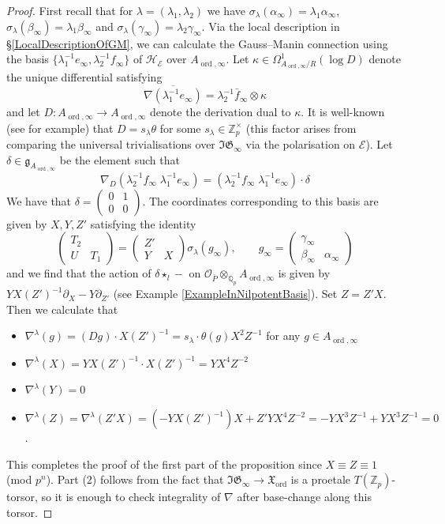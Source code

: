 \documentclass[10pt, oneside]{amsart}
\numberwithin{equation}{subsection}
\theoremstyle{definition}
\theoremstyle{remark}
\newcommand{\mbb}[1]{\mathbb{#1}}
\newcommand{\opn}[1]{\operatorname{#1}}
\newcommand{\tbyt}[4]{\left( \begin{matrix} #1 & #2 \\ #3 & #4 \end{matrix} \right)}
\begin{document}
\begin{proof}
First recall that for $\lambda = (\lambda_1, \lambda_2)$ we have $\sigma_{\lambda}(\alpha_{\infty}) = \lambda_1 \alpha_{\infty}$, $\sigma_{\lambda}(\beta_{\infty}) = \lambda_1 \beta_{\infty}$ and $\sigma_{\lambda}(\gamma_{\infty}) = \lambda_2 \gamma_{\infty}$. Via the local description in \S \ref{LocalDescriptionOfGM}, we can calculate the Gauss--Manin connection using the basis $\{\lambda_1^{-1} e_{\infty}, \lambda_2^{-1} f_{\infty} \}$ of $\mathcal{H}_{\mathcal{E}}$ over $A_{\opn{ord}, \infty}$.  Let $\kappa \in \Omega^1_{A_{\opn{ord}, \infty}/R}(\opn{log}D)$ denote the unique differential satisfying 
\[
 \overline{\nabla(\lambda_1^{-1}e_{\infty})} = \lambda_2^{-1}\bar{f}_{\infty} \otimes \kappa
\]
and let $D \colon A_{\opn{ord}, \infty} \to A_{\opn{ord}, \infty}$ denote the derivation dual to $\kappa$. It is well-known (see \cite{howe2020unipotent} for example) that $D = s_{\lambda} \theta$ for some $s_{\lambda} \in \mbb{Z}_p^{\times}$ (this factor arises from comparing the universal trivialisations over $\mathfrak{IG}_{\infty}$ via the polarisation on $\mathcal{E}$). Let $\delta \in \mathfrak{g}_{A_{\opn{ord}, \infty}}$ be the element such that
\[
 \nabla_{D}(\lambda_2^{-1}f_{\infty} \; \lambda_1^{-1}e_{\infty} ) = (\lambda_2^{-1}f_{\infty} \; \lambda_1^{-1}e_{\infty}) \cdot \delta 
\]
We have that $\delta = \tbyt{0}{1}{0}{0}$. The coordinates corresponding to this basis are given by $X, Y, Z'$ satisfying the identity
\[
\tbyt{T_2}{}{U}{T_1} = \tbyt{Z'}{}{Y}{X} \sigma_{\lambda}(g_{\infty}), \quad \quad g_{\infty} = \tbyt{\gamma_{\infty}}{}{\beta_{\infty}}{\alpha_{\infty}}
\]
and we find that the action of $\delta \star_l -$ on $\mathcal{O}_{\overline{P}} \otimes_{\mbb{Q}_p} A_{\opn{ord}, \infty}$ is given by $Y X (Z')^{-1} \partial_{X} - Y \partial_{Z'}$ (see Example \ref{ExampleInNilpotentBasis}). Set $Z = Z' X$. Then we calculate that
\begin{itemize}
\item $\nabla^{\lambda}(g) = (Dg) \cdot X (Z')^{-1} = s_{\lambda} \cdot \theta(g) X^2 Z^{-1}$ for any $g \in A_{\opn{ord}, \infty}$
    \item $\nabla^{\lambda}(X) = YX (Z')^{-1} \cdot X (Z')^{-1} = Y X^4 Z^{-2}$
    \item $\nabla^{\lambda}(Y) = 0$
    \item $\nabla^{\lambda}(Z) = \nabla^{\lambda}(Z' X) = (-Y X (Z')^{-1})X + Z' Y X^4 Z^{-2} = - Y X^3 Z^{-1} + Y X^3 Z^{-1} = 0$.
\end{itemize}
This completes the proof of the first part of the proposition since $X \equiv Z \equiv 1$ (mod $p^n$). Part (2) follows from the fact that $\mathfrak{IG}_{\infty} \to \mathfrak{X}_{\opn{ord}}$ is a proetale $T(\mbb{Z}_p)$-torsor, so it is enough to check integrality of $\nabla$ after base-change along this torsor.
\end{proof}
\end{document}
